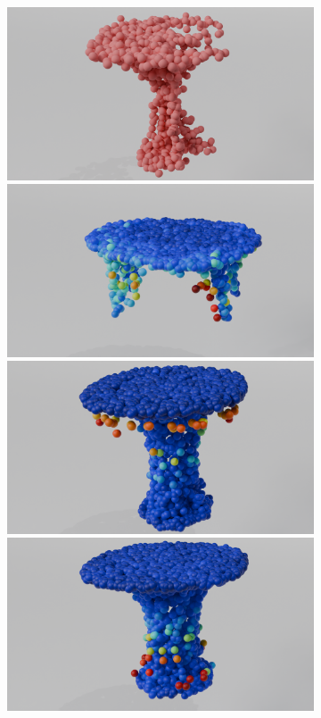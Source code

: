 \begin{figure}[htb]
\begin{subfigure}[t]{0.315\textwidth}
            \includegraphics[width=\textwidth]{figures/part_t3.png}
            \includegraphics[width=\textwidth]{figures/dc_lin_t3.png}
            \includegraphics[width=\textwidth]{figures/do_lin_t3.png}
            \includegraphics[width=\textwidth]{figures/ens_lin_t3.png}

\end{subfigure}
\end{figure}
